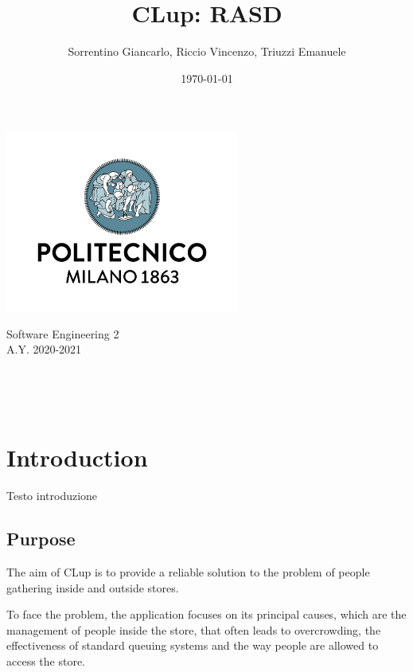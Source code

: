 \documentclass[a4paper,oneside,11pt]{book}   %
\title{CLup: RASD}
\author{Sorrentino Giancarlo, Riccio Vincenzo, Triuzzi Emanuele}
\date{\today}
\begin{document}
\begin{titlingpage} %
    \begin{center}
        \includegraphics[height=6cm]{pictures/polimi}\\ %
        \begin{large}
            Software Engineering 2 \\ %
            A.Y. 2020-2021\\
        \end{large}
        \vspace{4cm} %
        \begin{large} 
            \textbf{\thetitle} \\
        \end{large}
        \theauthor\\
        \vspace{8cm} %
        \thedate
    \end{center}
\end{titlingpage}

\newpage
{}
\tableofcontents

\newpage
{}
\chapter{Introduction}
    Testo introduzione
    
    \section{Purpose}
    The aim of CLup is to provide a reliable solution to the problem of people gathering inside and outside stores.
    
    To face the problem, the application focuses on its principal causes, which are the management of people inside the store, that often leads to overcrowding, the effectiveness of standard queuing systems and the way people are allowed to access the store. 
    
\end{document}

